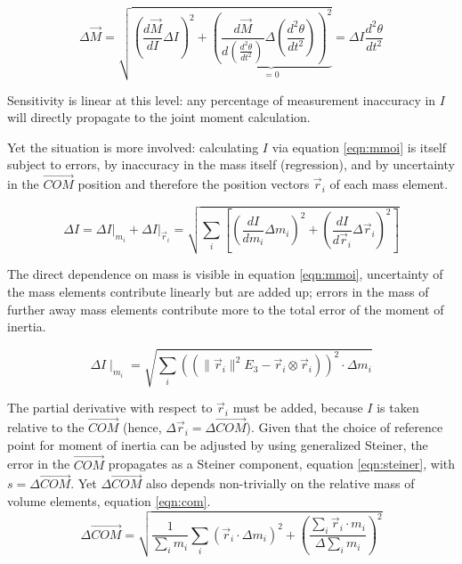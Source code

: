 \begin{change}
\begin{equation}\label{eqn:moment_error}
\Delta \vec{M} = \sqrt{\left(\frac{d \vec{M}}{d I}\Delta I\right)^2 + \underbrace{\left(\frac{d \vec{M}}{d \left(\frac{d^2\theta}{dt^2}\right)}\Delta \left(\frac{d^2\theta}{dt^2}\right)\right)^2}_{=0} } = \Delta I \frac{d^2\theta}{dt^2}
\end{equation}
\end{change}



Sensitivity is linear at this level: any percentage of measurement inaccuracy in \(I\) will directly propagate to the joint moment calculation.


Yet the situation is more involved: calculating \(I\) via equation \eqref{eqn:mmoi} is itself subject to errors, by inaccuracy in the mass itself (regression), and by uncertainty in the \(\vec{COM}\) position and therefore the position vectors \(\vec{r}_{i}\) of each mass element.
\begin{change}
\[ \Delta I = \left. \Delta I \right|_{m_i} + \left. \Delta I \right|_{\vec{r}_i} = \sqrt{ \sum_{i} \left[ \left(\frac{d I}{d m_{i}} \Delta m_{i} \right)^2 + \left(\frac{d I}{d \vec{r}_{i}} \Delta \vec{r}_{i}\right)^2 \right] }\]
\end{change}


The direct dependence on mass is visible in equation \eqref{eqn:mmoi}, uncertainty of the mass elements contribute linearly but are added up; errors in the mass of further away mass elements contribute more to the total error of the moment of inertia.
\begin{change}
\[ \Delta I \mid_{m_i} = \sqrt{\sum\limits_{i}\left(\left( \lVert \vec{r}_{i} \rVert ^2 E_3 - \vec{r}_{i} \otimes \vec{r}_{i} \right)\right)^2 \cdot \Delta m_{i} }\]
\end{change}


The partial derivative with respect to \(\vec{r}_{i}\) must be added, because \(I\) is taken relative to the \(\vec{COM}\) (hence, \(\Delta \vec{r}_i = \Delta \vec{COM}\)).
Given that the choice of reference point for moment of inertia can be adjusted by using generalized Steiner, the error in the \(\vec{COM}\) propagates as a Steiner component, equation \eqref{eqn:steiner}, with \(s=\Delta \vec{COM}\).
Yet \(\Delta \vec{COM}\) also depends non-trivially on the relative mass of volume elements, equation \eqref{eqn:com}.
\[ \Delta \vec{COM} = \sqrt{ \frac{1}{\sum_i m_{i}} \sum\limits_{i} \left( \vec{r}_{i} \cdot \Delta m_{i} \right)^2  + \left( \frac{ \sum\limits_{i} \vec{r}_{i} \cdot m_{i} }{\Delta \sum_i m_{i} }\right)^{2}}\]


